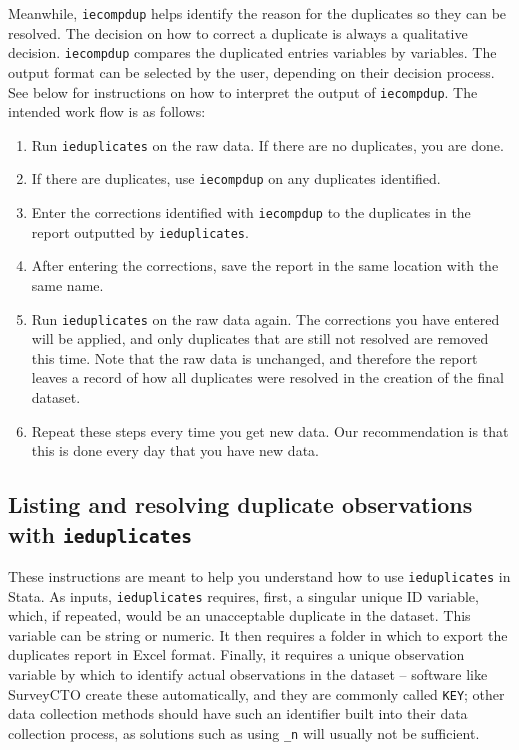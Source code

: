\documentclass{tufte-handout}
\begin{document}
Meanwhile, \texttt{iecompdup} helps identify the reason for the duplicates so they can be resolved.
The decision on how to correct a duplicate is always a qualitative decision.
\texttt{iecompdup} compares the duplicated entries variables by variables.
The output format can be selected by the user, depending on their decision process.
See below for instructions on how to interpret the output of \texttt{iecompdup}.
The intended work flow is as follows:

\begin{enumerate}
    \item Run \texttt{ieduplicates} on the raw data. If there are no duplicates, you are done.
    \item If there are duplicates, use \texttt{iecompdup} on any duplicates identified.
    \item Enter the corrections identified with \texttt{iecompdup} to the duplicates in the report outputted by \texttt{ieduplicates}.
    \item After entering the corrections, save the report in the same location with the same name.
    \item Run \texttt{ieduplicates} on the raw data again. The corrections you have entered will be applied, and only duplicates that are still not resolved are removed this time. Note that the raw data is unchanged, and therefore the report leaves a record of how all duplicates were resolved in the creation of the final dataset.
    \item Repeat these steps every time you get new data. Our recommendation is that this is done every day that you have new data.
\end{enumerate}

\subsection{Listing and resolving duplicate observations with \texttt{ieduplicates}}

These instructions are meant to help you understand how to use \texttt{ieduplicates} in Stata.
As inputs, \texttt{ieduplicates} requires, first, a singular unique ID variable,
which, if repeated, would be an unacceptable duplicate in the dataset.
This variable can be string or numeric.
It then requires a folder in which to export the duplicates report in Excel format.
Finally, it requires a unique observation variable by which to identify actual observations in the dataset --
software like SurveyCTO create these automatically, and they are commonly called \texttt{KEY};
other data collection methods should have such an identifier built into their data collection process,
as solutions such as using \texttt{\_n} will usually not be sufficient.
\end{document}
